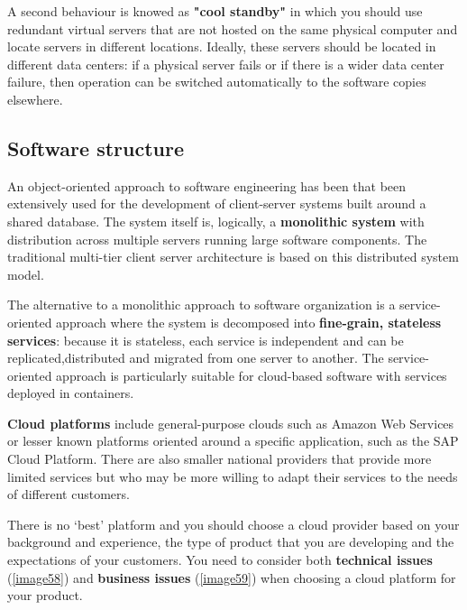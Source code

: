 \documentclass[10pt,a4paper]{report}
\begin{document}
A second behaviour is knowed as \textbf{"cool standby"} in which you should use redundant virtual servers that are not hosted on the same physical computer and locate servers in different locations.
Ideally, these servers should be located in different data centers: if a physical server fails or if there is a wider data center failure, then operation can be switched automatically to the software copies elsewhere.

\subsection{Software structure}

An object-oriented approach to software engineering has been that been
extensively used for the development of client-server systems built
around a shared database.
The system itself is, logically, a \textbf{monolithic system} with distribution across multiple servers running large software components. The traditional multi-tier client server architecture is based on this distributed system model.

The alternative to a monolithic approach to software organization is a service-oriented approach where the system is decomposed into \textbf{fine-grain, stateless services}: because it is stateless, each service is independent and can be replicated,distributed and migrated from one server to another. The service-oriented approach is particularly suitable for cloud-based software with services deployed in containers.

\textbf{Cloud platforms} include general-purpose clouds such as Amazon Web
Services or lesser known platforms oriented around a specific
application, such as the SAP Cloud Platform. There are also smaller
national providers that provide more limited services but who may be
more willing to adapt their services to the needs of different customers.

There is no ‘best’ platform and you should choose a cloud provider
based on your background and experience, the type of product that you
are developing and the expectations of your customers.
You need to consider both \textbf{technical issues} (\ref{image58}) and \textbf{business issues} (\ref{image59}) when
choosing a cloud platform for your product.
\end{document}
